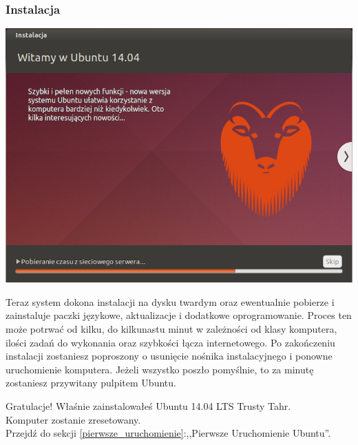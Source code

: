 \subsubsection{Instalacja}
\begin{center}
        \includegraphics[width=\linewidth]{images/instalator_kopiowanie.png}
\end{center}

Teraz system dokona instalacji na dysku twardym oraz ewentualnie pobierze i zainstaluje paczki językowe, aktualizacje i dodatkowe oprogramowanie. Proces ten może potrwać od kilku, do kilkunastu minut w zależności od klasy komputera, ilości zadań do wykonania oraz szybkości łącza internetowego. Po zakończeniu instalacji zostaniesz poproszony o usunięcie nośnika instalacyjnego i ponowne uruchomienie komputera. Jeżeli wszystko poszło pomyślnie, to za minutę zostaniesz przywitany pulpitem Ubuntu.
\begin{flushright}
\textcolor{ubuntu_orange}{Gratulacje!} Właśnie zainstalowałeś Ubuntu 14.04 LTS Trusty Tahr.\\
Komputer zostanie zresetowany.\\
Przejdź do sekcji \ref{pierwsze_uruchomienie}:,,Pierwsze Uruchomienie Ubuntu''.
\end{flushright}
\clearpage
